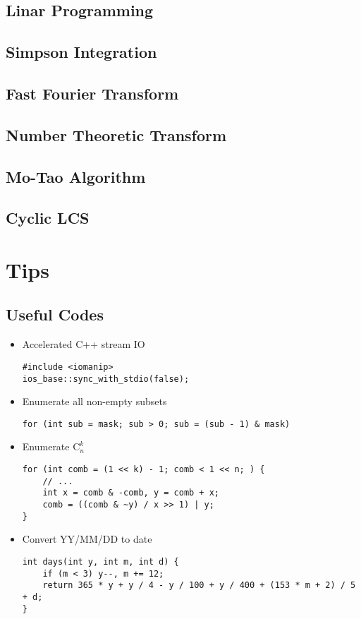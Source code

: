 \documentclass[10pt]{article}
\begin{document}
{\subsection{Linar Programming}

\subsection{Simpson Integration}

\subsection{Fast Fourier Transform}

\subsection{Number Theoretic Transform}

\subsection{Mo-Tao Algorithm}

\subsection{Cyclic LCS}

\section{Tips}
\subsection{Useful Codes}
\begin{itemize}
\item Accelerated C++ stream IO
\begin{lstlisting}[frame=none]
#include <iomanip>
ios_base::sync_with_stdio(false);
\end{lstlisting}
\item Enumerate all non-empty subsets
\begin{lstlisting}[frame=none]
for (int sub = mask; sub > 0; sub = (sub - 1) & mask)
\end{lstlisting}
\item Enumerate $\mathrm{C}_{n}^{k}$
\begin{lstlisting}[frame=none]
for (int comb = (1 << k) - 1; comb < 1 << n; ) {
	// ...
	int x = comb & -comb, y = comb + x;
	comb = ((comb & ~y) / x >> 1) | y;
}
\end{lstlisting}
\item Convert YY/MM/DD to date
\begin{lstlisting}[frame=none]
int days(int y, int m, int d) {
	if (m < 3) y--, m += 12;
	return 365 * y + y / 4 - y / 100 + y / 400 + (153 * m + 2) / 5 + d;
}
\end{lstlisting}
\end{itemize}
}
\end{document}
